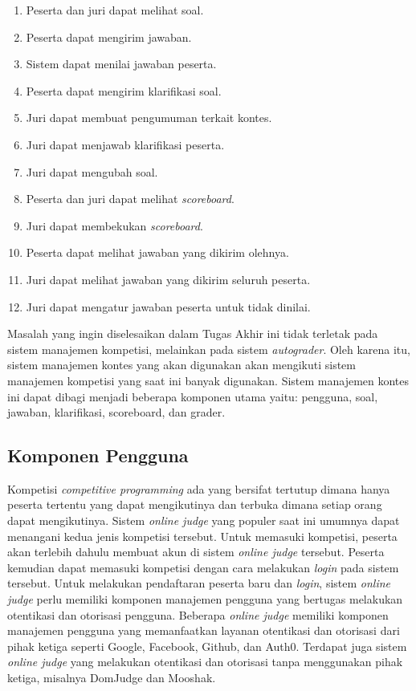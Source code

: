 \begin{enumerate}
    \item Peserta dan juri dapat melihat soal.
    \item Peserta dapat mengirim jawaban.
    \item Sistem dapat menilai jawaban peserta.
    \item Peserta dapat mengirim klarifikasi soal.
    \item Juri dapat membuat pengumuman terkait kontes.
    \item Juri dapat menjawab klarifikasi peserta.
    \item Juri dapat mengubah soal.
    \item Peserta dan juri dapat melihat \textit{scoreboard}.
    \item Juri dapat membekukan \textit{scoreboard}.
    \item Peserta dapat melihat jawaban yang dikirim olehnya.
    \item Juri dapat melihat jawaban yang dikirim seluruh peserta.
    \item Juri dapat mengatur jawaban peserta untuk tidak dinilai.
\end{enumerate}

\par Masalah yang ingin diselesaikan dalam Tugas Akhir ini tidak terletak pada sistem manajemen kompetisi, melainkan pada sistem \textit{autograder}. Oleh karena itu, sistem manajemen kontes yang akan digunakan akan mengikuti sistem manajemen kompetisi yang saat ini banyak digunakan. Sistem manajemen kontes ini dapat dibagi menjadi beberapa komponen utama yaitu: pengguna, soal, jawaban, klarifikasi, scoreboard, dan grader.

\subsection{Komponen Pengguna}

\par Kompetisi \textit{competitive programming} ada yang bersifat tertutup dimana hanya peserta tertentu yang dapat mengikutinya dan terbuka dimana setiap orang dapat mengikutinya. Sistem \textit{online judge} yang populer saat ini umumnya dapat menangani kedua jenis kompetisi tersebut. Untuk memasuki kompetisi, peserta akan terlebih dahulu membuat akun di sistem \textit{online judge} tersebut. Peserta kemudian dapat memasuki kompetisi dengan cara melakukan \textit{login} pada sistem tersebut. Untuk melakukan pendaftaran peserta baru dan \textit{login}, sistem \textit{online judge} perlu memiliki komponen manajemen pengguna yang bertugas melakukan otentikasi dan otorisasi pengguna. Beberapa \textit{online judge} memiliki komponen manajemen pengguna yang memanfaatkan layanan otentikasi dan otorisasi dari pihak ketiga seperti Google, Facebook, Github, dan Auth0. Terdapat juga sistem \textit{online judge} yang melakukan otentikasi dan otorisasi tanpa menggunakan pihak ketiga, misalnya DomJudge dan Mooshak.

